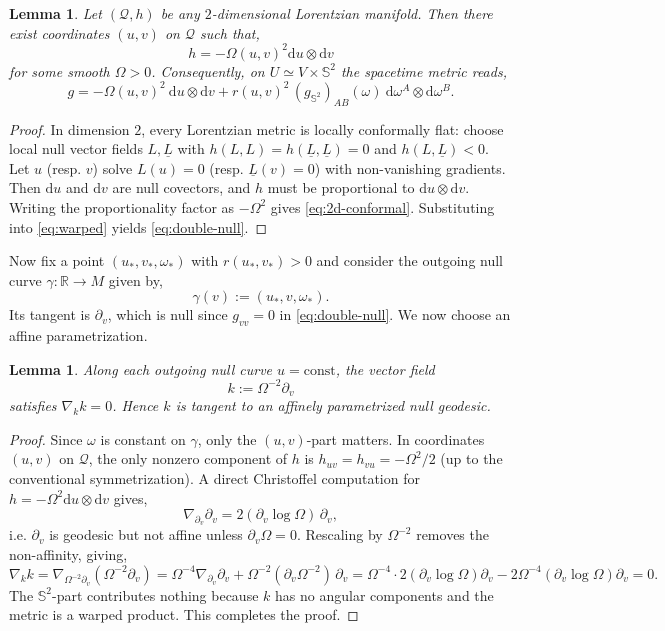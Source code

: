 \documentclass[a4paper, reqno]{amsart}
\numberwithin{equation}{section}
\theoremstyle{plain}
\newtheorem{lemma}[theorem]{Lemma}
\theoremstyle{definition}
\theoremstyle{remark}
\newcommand{\dd}{\mathrm{d}}
\begin{document}
\begin{lemma}\label{lem:double-null}
Let $(\mathcal Q,h)$ be any $2$-dimensional Lorentzian manifold. Then there exist coordinates $(u,v)$ on $\mathcal Q$ such that,
\begin{equation}\label{eq:2d-conformal}
h = -\Omega(u,v)^2 \dd u\otimes \dd v
\end{equation}
for some smooth $\Omega>0$. Consequently, on $U\simeq V\times \mathbb S^2$ the spacetime metric reads,
\begin{equation}\label{eq:double-null}
g = -\Omega(u,v)^2\ \dd u \otimes \dd v + r(u,v)^2\,(g_{\mathbb{S}^2})_{AB}(\omega)\ \dd\omega^A\otimes \dd\omega^B.
\end{equation}
\end{lemma}
\begin{proof}
In dimension $2$, every Lorentzian metric is locally conformally flat: choose local null vector fields
$L,\underline L$ with $h(L,L)=h(\underline L,\underline L)=0$ and $h(L,\underline L)<0$. Let $u$ (resp. $v$)
solve $L(u)=0$ (resp. $\underline L(v)=0$) with non-vanishing gradients. Then $\dd u$ and $\dd v$ are null covectors,
and $h$ must be proportional to $\dd u\otimes \dd v$. Writing the proportionality factor as $-\Omega^2$ gives \eqref{eq:2d-conformal}. Substituting into \eqref{eq:warped} yields \eqref{eq:double-null}.

\end{proof}

Now fix a point $(u_*,v_*,\omega_*)$ with $r(u_*,v_*)>0$ and consider the outgoing null curve $\gamma:\mathbb{R}\to M$ given by,
$$ \gamma(v):=(u_*,v,\omega_*).$$ Its tangent is $\partial_v$, which is null since $g_{vv}=0$ in \eqref{eq:double-null}. We now choose an affine parametrization.

\begin{lemma}\label{lem:affine}
Along each outgoing null curve $u=\mathrm{const}$, the vector field
\begin{equation}\label{eq:k}
k := \Omega^{-2}\partial_v
\end{equation}
satisfies $\nabla_k k=0$. Hence $k$ is tangent to an affinely parametrized null geodesic.
\end{lemma}
\begin{proof}
Since $\omega$ is constant on $\gamma$, only the $(u,v)$-part matters. In coordinates $(u,v)$ on $\mathcal Q$,
the only nonzero component of $h$ is $h_{uv}=h_{vu}=-\Omega^2/2$ (up to the conventional symmetrization).
A direct Christoffel computation for $h=-\Omega^2 \dd u\otimes \dd v$ gives,
$$\nabla_{\partial_v}\partial_v = 2(\partial_v\log\Omega)\,\partial_v,$$
i.e. $\partial_v$ is geodesic but not affine unless $\partial_v\Omega=0$. Rescaling by $\Omega^{-2}$ removes the
non-affinity, giving,
$$
\nabla_k k = \nabla_{\Omega^{-2}\partial_v}(\Omega^{-2}\partial_v) = \Omega^{-4}\nabla_{\partial_v}\partial_v + \Omega^{-2}(\partial_v\Omega^{-2})\,\partial_v = \Omega^{-4}\cdot 2(\partial_v\log\Omega)\partial_v -2\Omega^{-4}(\partial_v\log\Omega)\partial_v =0.
$$
The $\mathbb S^2$-part contributes nothing because $k$ has no angular components and the metric is a warped product. This completes the proof.

\end{proof}
\end{document}
